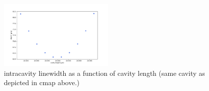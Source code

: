 \begin{figure}
    \centering
    \includegraphics[width=0.5\textwidth]{figures/cmap_lw_vs_l_intracavity.pdf}
    \caption{intracavity linewidth as a function of cavity length (same cavity as depicted in cmap above.)}
\end{figure}

